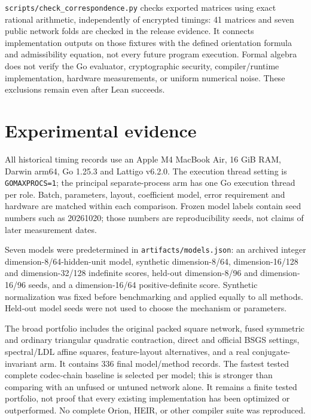 \documentclass[10pt]{article}
\begin{document}
\texttt{scripts/check\_correspondence.py} checks exported matrices using exact rational arithmetic, independently of encrypted timings: 41 matrices and seven public network folds are checked in the release evidence. It connects implementation outputs on those fixtures with the defined orientation formula and admissibility equation, not every future program execution. Formal algebra does not verify the Go evaluator, cryptographic security, compiler/runtime implementation, hardware measurements, or uniform numerical noise. These exclusions remain even after Lean succeeds.

\section{Experimental evidence}\label{sec:experiments}
All historical timing records use an Apple M4 MacBook Air, 16 GiB RAM, Darwin arm64, Go 1.25.3 and Lattigo v6.2.0. The execution thread setting is \texttt{GOMAXPROCS=1}; the principal separate-process arm has one Go execution thread per role. Batch, parameters, layout, coefficient model, error requirement and hardware are matched within each comparison. Frozen model labels contain seed numbers such as 20261020; those numbers are reproducibility seeds, not claims of later measurement dates.

Seven models were predetermined in \texttt{artifacts/models.json}: an archived integer dimension-8/64-hidden-unit model, synthetic dimension-8/64, dimension-16/128 and dimension-32/128 indefinite scores, held-out dimension-8/96 and dimension-16/96 seeds, and a dimension-16/64 positive-definite score. Synthetic normalization was fixed before benchmarking and applied equally to all methods. Held-out model seeds were not used to choose the mechanism or parameters.

The broad portfolio includes the original packed square network, fused symmetric and ordinary triangular quadratic contraction, direct and official BSGS settings, spectral/LDL affine squares, feature-layout alternatives, and a real conjugate-invariant arm. It contains 336 final model/method records. The fastest tested complete codec-chain baseline is selected per model; this is stronger than comparing with an unfused or untuned network alone. It remains a finite tested portfolio, not proof that every existing implementation has been optimized or outperformed. No complete Orion, HEIR, or other compiler suite was reproduced.
\end{document}
